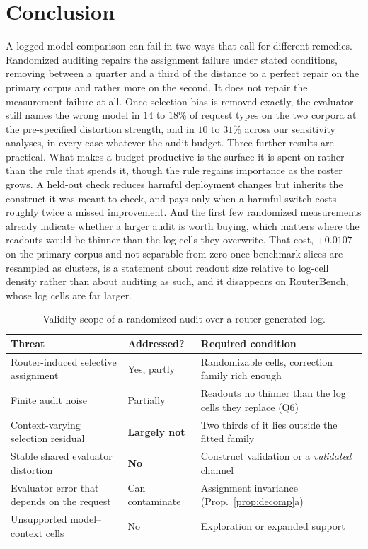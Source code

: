 \documentclass{article}
\theoremstyle{plain}
\theoremstyle{remark}
\begin{document}
\section{Conclusion}\label{sec:scope}
A logged model comparison can fail in two ways that call for different remedies. Randomized auditing
repairs the assignment failure under stated conditions, removing between a quarter and a third of the
distance to a perfect repair on the primary corpus and rather more on the second. It does not repair the
measurement failure at all. Once selection bias is removed exactly, the evaluator still names the
wrong model in $14$ to $18\%$ of request types on the two corpora at the pre-specified distortion
strength, and in $10$ to $31\%$ across our sensitivity analyses, in every case whatever the audit
budget. Three further results are
practical. What makes a budget productive is the surface it is spent on rather than the rule that
spends it, though the rule regains importance as the roster grows. A held-out check reduces harmful
deployment changes but inherits the construct it was meant to check, and pays only when a harmful
switch costs roughly twice a missed improvement. And the first few randomized measurements already
indicate whether a larger audit is worth buying, which matters where the readouts would be thinner
than the log cells they overwrite. That cost, $+0.0107$ on the primary corpus and not separable from
zero once benchmark slices are resampled as clusters, is a statement about readout size relative to
log-cell density rather than about auditing as such, and it disappears on RouterBench, whose log
cells are far larger.

\begin{table}[t]\centering\footnotesize\setlength{\tabcolsep}{5pt}
\caption{Validity scope of a randomized audit over a router-generated log.}
\label{tab:scope}
\begin{tabular}{@{}lll@{}}
\toprule
Threat & Addressed? & Required condition\\
\midrule
Router-induced selective assignment & Yes, partly & Randomizable cells, correction family rich enough\\
Finite audit noise & Partially & Readouts no thinner than the log cells they replace (Q6)\\
Context-varying selection residual & \textbf{Largely not} & Two thirds of it lies outside the fitted family\\
Stable shared evaluator distortion & \textbf{No} & Construct validation or a \emph{validated} channel\\
Evaluator error that depends on the request & Can contaminate & Assignment invariance (Prop.~\ref{prop:decomp}a)\\
Unsupported model--context cells & No & Exploration or expanded support\\
\bottomrule
\end{tabular}
\end{table}
\end{document}
